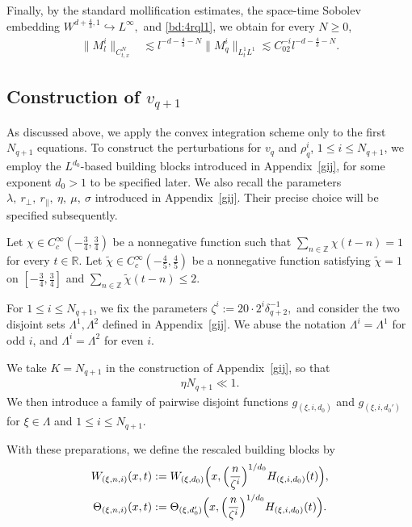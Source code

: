 \documentclass[10pt,a4paper]{amsart}
\numberwithin{equation}{section}
\def\geq{\geqslant}
\def\leq{\leqslant}
\def\geq{\geqslant}
\def\leq{\leqslant}
\begin{document}
Finally, by the standard mollification estimates, the space-time Sobolev embedding
$
W^{d+\frac43,1}\hookrightarrow L^\infty,
$
and \eqref{bd:4rql1}, we obtain for every $N\geq0$,
\begin{align}
\|M_l^i\|_{C_{t,x}^N}
&\lesssim
l^{-d-\frac43-N}
\|M_q^i\|_{L_t^1L^1}
\lesssim
C_02^{-i}l^{-d-\frac43-N}.
\label{bd:4mlcn}
\end{align} 
 

 
   


\subsection{Construction of $v_{q+1}$}\label{sec:4defq+1}
As discussed above, we apply the convex integration scheme only to the first $N_{q+1}$ equations. 
To construct the perturbations for $v_q$ and $\rho_q^i$, $1\leq i\leq N_{q+1}$, we employ the $L^{d_0}$-based building blocks introduced in Appendix~\ref{gij}, for some exponent $d_0>1$ to be specified later. 
We also recall the parameters
$
\lambda,\ r_\perp,\ r_\parallel,\ \eta,\ \mu,\ \sigma
$
introduced in Appendix~\ref{gij}. Their precise choice will be specified subsequently.

Let
$
\chi\in C_c^\infty(-\frac34,\frac34)
$
be a nonnegative function such that
$
\sum_{n\in\mathbb{Z}}\chi(t-n)=1
$
for every $t\in\mathbb{R}$.
Let
$
\tilde{\chi}\in C_c^\infty(-\frac45,\frac45)
$
be a nonnegative function satisfying
$
\tilde{\chi}=1
$
on
$
[-\frac34,\frac34]
$
and
$
\sum_{n\in\mathbb{Z}}\tilde{\chi}(t-n)\leq2.
$

For $1\leq i\leq N_{q+1}$, we fix the parameters
$
\zeta^i:=20\cdot2^i\delta_{q+2}^{-1},
$
and consider the two disjoint sets
$
\Lambda^1,\Lambda^2
$
defined in Appendix~\ref{gij}. 
We abuse the notation
$
\Lambda^i=\Lambda^1
$
for odd $i$, and
$
\Lambda^i=\Lambda^2
$
for even $i$.

We take
$
K=N_{q+1}
$
in the construction of Appendix~\ref{gij}, so that
\begin{align}
\eta N_{q+1}\ll1.
\label{etan}
\end{align}
We then introduce a family of pairwise disjoint functions
$
g_{(\xi,i,d_0)}
$
and
$
g_{(\xi,i,d_0')}
$
for
$
\xi\in\Lambda
$
and
$
1\leq i\leq N_{q+1}.
$

With these preparations, we define the rescaled building blocks by
\begin{align*}
W_{(\xi,n,i)}(x,t)
&:=
W_{(\xi,d_0)}
\Bigl(
x,
\Bigl(\frac{n}{\zeta^i}\Bigr)^{1/d_0}
H_{(\xi,i,d_0)}(t)
\Bigr),
\\
\Theta_{(\xi,n,i)}(x,t)
&:=
\Theta_{(\xi,d_0')}
\Bigl(
x,
\Bigl(\frac{n}{\zeta^i}\Bigr)^{1/d_0}
H_{(\xi,i,d_0)}(t)
\Bigr).
\end{align*}
\end{document}
